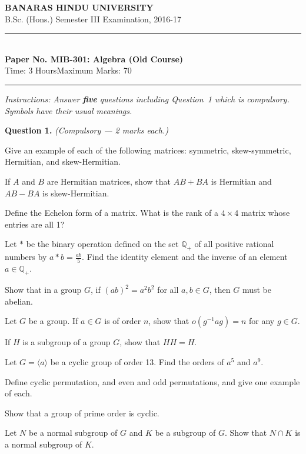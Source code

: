 \documentclass[11pt,a4paper]{article}
\begin{document}
\begin{center}
  {\large\bfseries BANARAS HINDU UNIVERSITY}\\[2pt]
  {\normalsize B.Sc. (Hons.) Semester III Examination, 2016-17}\\[6pt]
  \rule{0.8\linewidth}{0.5pt}\\[6pt]
  {\large\bfseries Paper No. MIB-301: Algebra (Old Course)}\\[4pt]
  {\normalsize Time: 3 Hours\hfill Maximum Marks: 70}
\end{center}

\rule{\linewidth}{0.4pt}

\smallskip



\noindent   \textit{Instructions: Answer   \textbf{five} questions including Question~1 which is compulsory. Symbols have their usual meanings.}

\bigskip




\noindent   \textbf{Question 1.}   \textit{(Compulsory --- 2 marks each.)}

\begin{parts}
  \item Give an example of each of the following matrices: symmetric, skew-symmetric, Hermitian, and skew-Hermitian.
  \item If $A$ and $B$ are Hermitian matrices, show that $AB + BA$ is Hermitian and $AB - BA$ is skew-Hermitian.
  \item Define the Echelon form of a matrix. What is the rank of a $4 \times 4$ matrix whose entries are all 1?
  \item Let $*$ be the binary operation defined on the set $\mathbb{Q}_+$ of all positive rational numbers by $a * b = \frac{ab}{5}$. Find the identity element and the inverse of an element $a \in \mathbb{Q}_+$.
  \item Show that in a group $G$, if $(ab)^2 = a^2b^2$ for all $a, b \in G$, then $G$ must be abelian.
  \item Let $G$ be a group. If $a \in G$ is of order $n$, show that $o(g^{-1}ag) = n$ for any $g \in G$.
  \item If $H$ is a subgroup of a group $G$, show that $HH = H$.
  \item Let $G = \langle a \rangle$ be a cyclic group of order 13. Find the orders of $a^5$ and $a^9$.
  \item Define cyclic permutation, and even and odd permutations, and give one example of each.
  \item Show that a group of prime order is cyclic.
  \item Let $N$ be a normal subgroup of $G$ and $K$ be a subgroup of $G$. Show that $N \cap K$ is a normal subgroup of $K$.
\end{parts}
\end{document}
